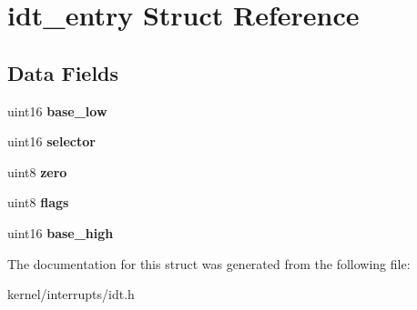 \hypertarget{structidt__entry}{
\section{idt\_\-entry Struct Reference}
\label{structidt__entry}
}
\subsection*{Data Fields}
\begin{DoxyCompactItemize}
\item 
\hypertarget{structidt__entry_ac0d9e52c650c8ad29d2d34630c6791ad}{
uint16 {\bfseries base\_\-low}}
\label{structidt__entry_ac0d9e52c650c8ad29d2d34630c6791ad}

\item 
\hypertarget{structidt__entry_aef665e4df7cdfdd871293ae02be1af8e}{
uint16 {\bfseries selector}}
\label{structidt__entry_aef665e4df7cdfdd871293ae02be1af8e}

\item 
\hypertarget{structidt__entry_a1c7fe612c423ff15391b526b7c64388d}{
uint8 {\bfseries zero}}
\label{structidt__entry_a1c7fe612c423ff15391b526b7c64388d}

\item 
\hypertarget{structidt__entry_a630f3c16426126a6040aeb98f7802000}{
uint8 {\bfseries flags}}
\label{structidt__entry_a630f3c16426126a6040aeb98f7802000}

\item 
\hypertarget{structidt__entry_ac9cf77d6993b9cacad18523c93b4c00f}{
uint16 {\bfseries base\_\-high}}
\label{structidt__entry_ac9cf77d6993b9cacad18523c93b4c00f}

\end{DoxyCompactItemize}


The documentation for this struct was generated from the following file:\begin{DoxyCompactItemize}
\item 
kernel/interrupts/idt.h\end{DoxyCompactItemize}
